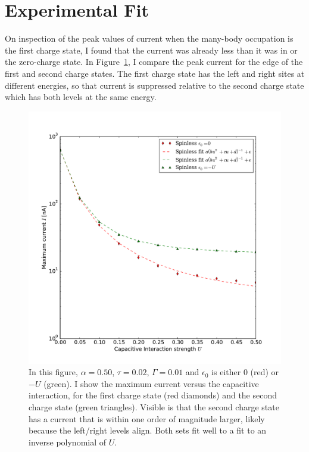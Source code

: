 \clearpage\section{Experimental Fit}
\label{sec:perrin}
On inspection of the peak values of current when the many-body occupation is the first charge state, I found that the current was already less than it was in \citet{perrinnano} or the zero-charge state. In Figure~\ref{fig:imax}, I compare the peak current for the edge of the first and second charge states. The first charge state has the left and right sites at different energies, so that current is suppressed relative to the second charge state which has both levels at the same energy.
\begin{figure}[bt]
    \centering
    \includegraphics[height=.38\textheight]{pdf/imax.pdf}
    \caption{In this figure, $\alpha=0.50$, $\tau=0.02$, $\Gamma=0.01$ and $\epsilon_0$ is either $0$ (red) or $-U$ (green). I show the maximum current versus the capacitive interaction, for the first charge state (red diamonds) and the second charge state (green triangles). Visible is that the second charge state has a current that is within one order of magnitude larger, likely because the left/right levels align. Both sets fit well to a fit to an inverse polynomial of $U$.}
    \label{fig:imax}
\end{figure}

